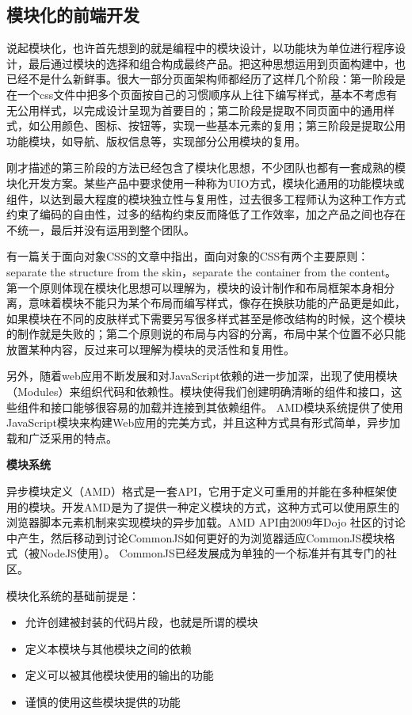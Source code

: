 
\subsection{模块化的前端开发}

\indent
说起模块化，也许首先想到的就是编程中的模块设计，以功能块为单位进行程序设计，最后通过模块的选择和组合构成最终产品。把这种思想运用到页面构建中，也已经不是什么新鲜事。很大一部分页面架构师都经历了这样几个阶段：第一阶段是在一个css文件中把多个页面按自己的习惯顺序从上往下编写样式，基本不考虑有无公用样式，以完成设计呈现为首要目的；第二阶段是提取不同页面中的通用样式，如公用颜色、图标、按钮等，实现一些基本元素的复用；第三阶段是提取公用功能模块，如导航、版权信息等，实现部分公用模块的复用。

\indent
刚才描述的第三阶段的方法已经包含了模块化思想，不少团队也都有一套成熟的模块化开发方案。某些产品中要求使用一种称为UIO方式，模块化通用的功能模块或组件，以达到最大程度的模块独立性与复用性，过去很多工程师认为这种工作方式约束了编码的自由性，过多的结构约束反而降低了工作效率，加之产品之间也存在不统一，最后并没有运用到整个团队。

\indent
有一篇关于面向对象CSS的文章中指出，面向对象的CSS有两个主要原则：separate the structure from the skin，separate the container from the content。第一个原则体现在模块化思想可以理解为，模块的设计制作和布局框架本身相分离，意味着模块不能只为某个布局而编写样式，像存在换肤功能的产品更是如此，如果模块在不同的皮肤样式下需要另写很多样式甚至是修改结构的时候，这个模块的制作就是失败的；第二个原则说的布局与内容的分离，布局中某个位置不必只能放置某种内容，反过来可以理解为模块的灵活性和复用性。

\indent
另外，随着web应用不断发展和对JavaScript依赖的进一步加深，出现了使用模块（Modules）来组织代码和依赖性。模块使得我们创建明确清晰的组件和接口，这些组件和接口能够很容易的加载并连接到其依赖组件。 AMD模块系统提供了使用JavaScript模块来构建Web应用的完美方式，并且这种方式具有形式简单，异步加载和广泛采用的特点。

\textbf{模块系统}
\par
异步模块定义（AMD）格式是一套API，它用于定义可重用的并能在多种框架使用的模块。开发AMD是为了提供一种定义模块的方式，这种方式可以使用原生的浏览器脚本元素机制来实现模块的异步加载。AMD API由2009年Dojo 社区的讨论中产生，然后移动到讨论CommonJS如何更好的为浏览器适应CommonJS模块格式（被NodeJS使用）。 CommonJS已经发展成为单独的一个标准并有其专门的社区。

\indent
模块化系统的基础前提是：
\begin{itemize}
	\item 允许创建被封装的代码片段，也就是所谓的模块
	\item 定义本模块与其他模块之间的依赖
	\item 定义可以被其他模块使用的输出的功能
	\item 谨慎的使用这些模块提供的功能
\end{itemize}

